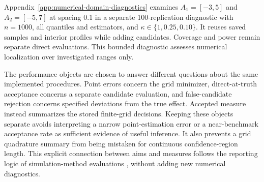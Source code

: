 Appendix~\ref{app:numerical-domain-diagnostics} examines $A_1=[-3,5]$ and $A_2=[-5,7]$ at spacing 0.1 in a separate 100-replication diagnostic with $n=1000$, all quantiles and estimators, and $\kappa\in\{1,0.25,0.10\}$. It reuses saved samples and interior profiles while adding candidates. Coverage and power remain separate direct evaluations. This bounded diagnostic assesses numerical localization over investigated ranges only.

The performance objects are chosen to answer different questions about the same implemented procedures. Point errors concern the grid minimizer, direct-at-truth acceptance concerns a separate candidate evaluation, and false-candidate rejection concerns specified deviations from the true effect. Accepted measure instead summarizes the stored finite-grid decisions. Keeping these objects separate avoids interpreting a narrow point-estimation error or a near-benchmark acceptance rate as sufficient evidence of useful inference. It also prevents a grid quadrature summary from being mistaken for continuous confidence-region length. This explicit connection between aims and measures follows the reporting logic of simulation-method evaluations \parencite{morris_white_crowther_2019}, without adding new numerical diagnostics.
